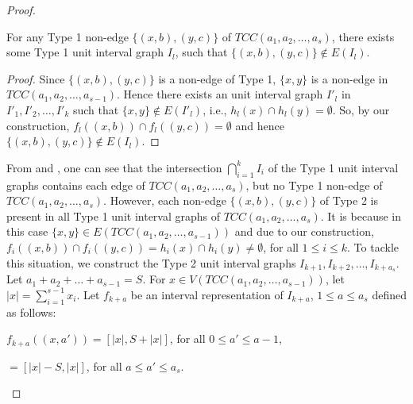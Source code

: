 \documentclass[10pt,a4paper]{amsart}
\newcommand{\G}{\Gamma}
\newcommand{\TT}{TCC(a_1,a_2,\dots,a_s)}
\newcommand{\T}{TCC(a_1,a_2,\dots,a_{s-1})}
\begin{document}
\begin{proof}
   \begin{claim}\label{type 1 interval graphs and non-edge}
       For any Type 1 non-edge $\{(x,b),(y,c)\}$ of $\TT$,
    there exists some Type 1 unit interval graph $I_l$, such that $\{(x,b),(y,c)\} \notin E(I_l)$.
   \end{claim} 
    \begin{proof}
        Since $\{(x,b),(y,c)\}$ is a non-edge of Type 1, $\{x,y\}$ is a non-edge in $\T$. Hence there exists an unit interval graph $I'_l$ in $I'_1,I'_2,\dots,I'_k$ such that $\{x,y\} \notin E(I'_l)$, i.e., $h_l(x)\cap h_l(y)=\emptyset$. So, by our construction, $f_l((x,b))\cap f_l((y,c))=\emptyset$ and hence $\{(x,b),(y,c)\} \notin E(I_l)$.
    \end{proof}

From  and , one can see that the intersection $\bigcap_{i=1}^k I_i$ of the Type 1 unit interval graphs contains each edge of $\TT$, but no Type 1 non-edge of $\TT$.  %
However, each non-edge $\{(x,b),(y,c)\}$ of Type 2 is present in all Type 1 unit interval graphs of $\TT$. It is because in this case $\{x,y\} \in E(\T)$ and due to our construction, $f_i((x,b)) \cap f_i((y,c)) =h_i(x) \cap h_i(y) \neq \emptyset$, for all $1 \leq i \leq k$. To tackle this situation, we construct the Type 2 unit interval graphs $I_{k+1}, I_{k+2}, \dots, I_{k+a_s}$. Let $a_1+ a_2 + \dots + a_{s-1}=S$. For $x \in V(\T)$, let $|x|=\sum_{i=1}^{s-1}x_i$. Let $f_{k+a}$ be an interval representation of $I_{k+a}$, $1 \leq a \leq a_s$ defined as follows:

\begin{center}
    $f_{k+a}((x,a')) = [|x|,S+|x|]$, for all $0 \leq a' \leq a-1$,

     \hspace{1.4cm}        $= [|x|-S,|x|]$, for all $a \leq a' \leq a_s$.


\end{center}
\end{proof}
\end{document}
